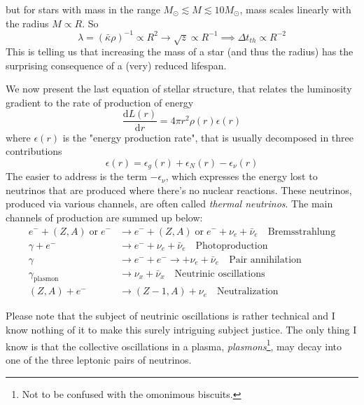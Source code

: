but for stars with mass in the range $M_{\odot}\lesssim M \lesssim 10M_{\odot}$, mass scales linearly with the radius $M\propto R$. So
\begin{equation*}
	\lambda = (\bar{\kappa}\rho)^{-1} \propto R^{2} \to \sqrt{z} \propto R^{-1} \implies \Delta t_{th} \propto R^{-2}
\end{equation*}
This is telling us that increasing the mass of a star (and thus the radius) has the surprising consequence of a (very) reduced lifespan.
\newline 
\par We now present the last equation of stellar structure, that relates the luminosity gradient to the rate of production of energy
\begin{equation}
	\boxed{
		\frac{\text{d}L(r)}{\text{d}r} = 4\pi r^{2} \rho(r)\epsilon(r)
	}
	\label{eq:energyproduction}
\end{equation}
where $\epsilon(r)$ is the "energy production rate", that is usually decomposed in three contributions
\begin{equation*}
	\epsilon(r) = \epsilon_{g}(r) + \epsilon_{N}(r) - \epsilon_{\nu}(r)
\end{equation*}
The easier to address is the term $-\epsilon_{\nu}$, which expresses the energy lost to neutrinos that are produced where there's no nuclear reactions. These neutrinos, produced via various channels, are often called \emph{thermal neutrinos}. The main channels of production are summed up below:
\begin{align*}
	e^{-} + (Z, A)\;\text{or}\;e^{-} & \to e^{-} + (Z,A)\;\text{or}\;e^{-} +\nu_{e}+\bar{\nu}_{e} \quad \text{Bremsstrahlung}\\
	\gamma + e^{-} & \to e^{-} +\nu_{e}+\bar{\nu}_{e} \quad \text{Photoproduction}\\
	\gamma & \to e^{-} + e^{-} \to +\nu_{e}+\bar{\nu}_{e} \quad \text{Pair annihilation}\\
	\gamma_{\text{plasmon}} & \to \nu_{x} + \bar{\nu}_{x} \quad \text{Neutrinic oscillations} \\
	(Z,A) + e^{-} & \to (Z-1,A)+\nu_{e} \quad \text{Neutralization}
\end{align*}
\par Please note that the subject of neutrinic oscillations is rather technical and I know nothing of it to make this surely intriguing subject justice. The only thing I know is that the collective oscillations in a plasma, \emph{plasmons}\footnote{Not to be confused with the omonimous biscuits.}, may decay into one of the three leptonic pairs of neutrinos.
